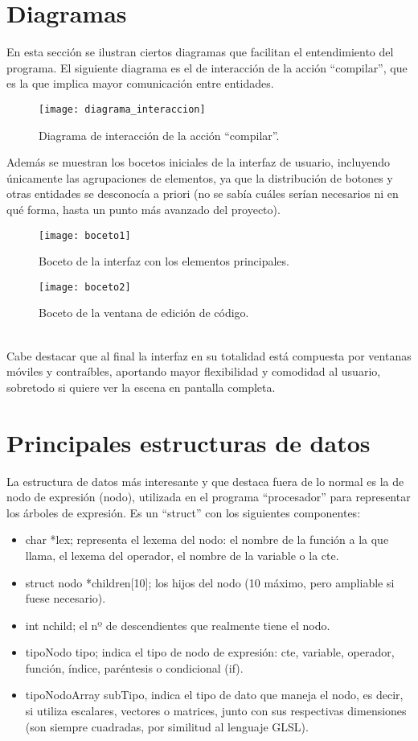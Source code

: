 \section{Diagramas}
En esta sección se ilustran ciertos diagramas que facilitan el entendimiento del programa. El siguiente diagrama es el de interacción de la acción ``compilar'', que es la que implica mayor comunicación entre entidades.\\
\begin{figure}[h]
  	\centering
  	\texttt{[image: diagrama\_interaccion]}
  	\caption{Diagrama de interacción de la acción ``compilar''.}
  	\label{fig:diagrama_interaccion}
\end{figure}
\newpage
Además se muestran los bocetos iniciales de la interfaz de usuario, incluyendo únicamente las agrupaciones de elementos, ya que la distribución de botones y otras entidades se desconocía a priori (no se sabía cuáles serían necesarios ni en qué forma, hasta un punto más avanzado del proyecto).\\
\begin{figure}[h]
  	\centering
  	\texttt{[image: boceto1]}
  	\caption{Boceto de la interfaz con los elementos principales.}
  	\texttt{[image: boceto2]}
  	\caption{Boceto de la ventana de edición de código.}
  	\label{fig:bocetos_interfaz}
\end{figure}
\\Cabe destacar que al final la interfaz en su totalidad está compuesta por ventanas móviles y contraíbles, aportando mayor flexibilidad y comodidad al usuario, sobretodo si quiere ver la escena en pantalla completa.

\section{Principales estructuras de datos}

La estructura de datos más interesante y que destaca fuera de lo normal es la de nodo de expresión (nodo), utilizada en el programa ``procesador'' para representar los árboles de expresión. Es un ``struct'' con los siguientes componentes:
\begin{itemize}
	\item char *lex; representa el lexema del nodo: el nombre de la función a la que llama, el lexema del operador, el nombre de la variable o la cte.
	\item struct nodo *children[10]; los hijos del nodo (10 máximo, pero ampliable si fuese necesario).
	\item int nchild; el nº de descendientes que realmente tiene el nodo.
	\item tipoNodo tipo; indica el tipo de nodo de expresión: cte, variable, operador, función, índice, paréntesis o condicional (if).
	\item tipoNodoArray subTipo, indica el tipo de dato que maneja el nodo, es decir, si utiliza escalares, vectores o matrices, junto con sus respectivas dimensiones (son siempre cuadradas, por similitud al lenguaje GLSL).
\end{itemize}

